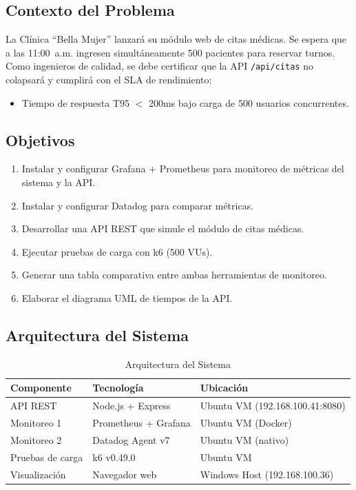 \documentclass[12pt, a4paper]{article}
\begin{document}
\subsection{Contexto del Problema}

La Clínica ``Bella Mujer'' lanzará su módulo web de citas médicas. Se espera que a las 11:00~a.m. ingresen simultáneamente 500 pacientes para reservar turnos. Como ingenieros de calidad, se debe certificar que la API \texttt{/api/citas} no colapsará y cumplirá con el SLA de rendimiento:

\begin{itemize}
    \item Tiempo de respuesta T95 $<$ 200ms bajo carga de 500 usuarios concurrentes.
\end{itemize}

\subsection{Objetivos}

\begin{enumerate}
    \item Instalar y configurar Grafana + Prometheus para monitoreo de métricas del sistema y la API.
    \item Instalar y configurar Datadog para comparar métricas.
    \item Desarrollar una API REST que simule el módulo de citas médicas.
    \item Ejecutar pruebas de carga con k6 (500 VUs).
    \item Generar una tabla comparativa entre ambas herramientas de monitoreo.
    \item Elaborar el diagrama UML de tiempos de la API.
\end{enumerate}

\subsection{Arquitectura del Sistema}

\begin{table}[H]
\centering
\caption{Arquitectura del Sistema}
\label{tab:arquitectura}
\begin{tabular}{lll}
\toprule
\textbf{Componente} & \textbf{Tecnología} & \textbf{Ubicación} \\
\midrule
API REST & Node.js + Express & Ubuntu VM (192.168.100.41:8080) \\
Monitoreo 1 & Prometheus + Grafana & Ubuntu VM (Docker) \\
Monitoreo 2 & Datadog Agent v7 & Ubuntu VM (nativo) \\
Pruebas de carga & k6 v0.49.0 & Ubuntu VM \\
Visualización & Navegador web & Windows Host (192.168.100.36) \\
\bottomrule
\end{tabular}
\end{table}
\end{document}
